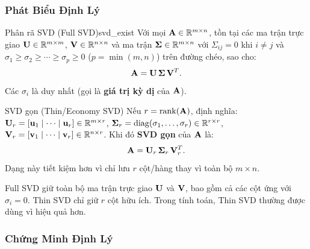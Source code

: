 \subsubsection{Phát Biểu Định Lý}

\begin{mythm}{Phân rã SVD (Full SVD)}{svd_exist}
Với mọi $\mathbf{A} \in \mathbb{R}^{m \times n}$, tồn tại các ma trận trực giao
$\mathbf{U} \in \mathbb{R}^{m \times m}$, $\mathbf{V} \in \mathbb{R}^{n \times n}$ và ma trận
$\boldsymbol{\Sigma} \in \mathbb{R}^{m \times n}$ với $\Sigma_{ij} = 0$ khi $i \neq j$
và $\sigma_1 \geq \sigma_2 \geq \cdots \geq \sigma_p \geq 0$ ($p = \min(m,n)$)
trên đường chéo, sao cho:
\[
    \mathbf{A} = \mathbf{U}\,\boldsymbol{\Sigma}\,\mathbf{V}^T.
\]
Các $\sigma_i$ là duy nhất (gọi là \textbf{giá trị kỳ dị} của $\mathbf{A}$).
\end{mythm}

\begin{mydef}{SVD gọn (Thin/Economy SVD)}{}
Nếu $r = \operatorname{rank}(\mathbf{A})$, định nghĩa:
$\mathbf{U}_r = [\mathbf{u}_1 \mid \cdots \mid \mathbf{u}_r] \in \mathbb{R}^{m \times r}$,
$\boldsymbol{\Sigma}_r = \operatorname{diag}(\sigma_1, \ldots, \sigma_r) \in \mathbb{R}^{r \times r}$,
$\mathbf{V}_r = [\mathbf{v}_1 \mid \cdots \mid \mathbf{v}_r] \in \mathbb{R}^{n \times r}$.
Khi đó \textbf{SVD gọn} của $\mathbf{A}$ là:
\[
    \mathbf{A} = \mathbf{U}_r\,\boldsymbol{\Sigma}_r\,\mathbf{V}_r^T.
\]
Dạng này tiết kiệm hơn vì chỉ lưu $r$ cột/hàng thay vì toàn bộ $m \times n$.
\end{mydef}

\begin{note}
Full SVD giữ toàn bộ ma trận trực giao $\mathbf{U}$ và $\mathbf{V}$, bao gồm cả các
cột ứng với $\sigma_i = 0$. Thin SVD chỉ giữ $r$ cột hữu ích.
Trong tính toán, Thin SVD thường được dùng vì hiệu quả hơn.
\end{note}

\subsubsection{Chứng Minh Định Lý}

